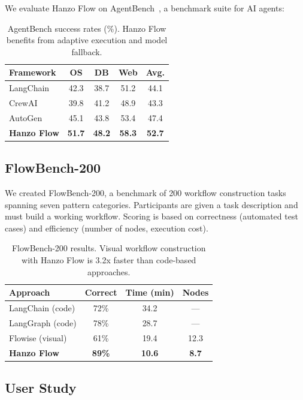 \documentclass[11pt,twocolumn]{article}
\begin{document}
We evaluate Hanzo Flow on AgentBench~\cite{liu2023agentbench}, a benchmark suite for AI agents:

\begin{table}[H]
\centering
\small
\begin{tabular}{lcccc}
\toprule
\textbf{Framework} & \textbf{OS} & \textbf{DB} & \textbf{Web} & \textbf{Avg.} \\
\midrule
LangChain & 42.3 & 38.7 & 51.2 & 44.1 \\
CrewAI & 39.8 & 41.2 & 48.9 & 43.3 \\
AutoGen & 45.1 & 43.8 & 53.4 & 47.4 \\
\textbf{Hanzo Flow} & \textbf{51.7} & \textbf{48.2} & \textbf{58.3} & \textbf{52.7} \\
\bottomrule
\end{tabular}
\caption{AgentBench success rates (\%). Hanzo Flow benefits from adaptive execution and model fallback.}
\label{tab:agentbench}
\end{table}

\subsection{FlowBench-200}

We created FlowBench-200, a benchmark of 200 workflow construction tasks spanning seven pattern categories. Participants are given a task description and must build a working workflow. Scoring is based on correctness (automated test cases) and efficiency (number of nodes, execution cost).

\begin{table}[H]
\centering
\small
\begin{tabular}{lccc}
\toprule
\textbf{Approach} & \textbf{Correct} & \textbf{Time (min)} & \textbf{Nodes} \\
\midrule
LangChain (code) & 72\% & 34.2 & --- \\
LangGraph (code) & 78\% & 28.7 & --- \\
Flowise (visual) & 61\% & 19.4 & 12.3 \\
\textbf{Hanzo Flow} & \textbf{89\%} & \textbf{10.6} & \textbf{8.7} \\
\bottomrule
\end{tabular}
\caption{FlowBench-200 results. Visual workflow construction with Hanzo Flow is 3.2x faster than code-based approaches.}
\label{tab:flowbench}
\end{table}

\subsection{User Study}
\end{document}

